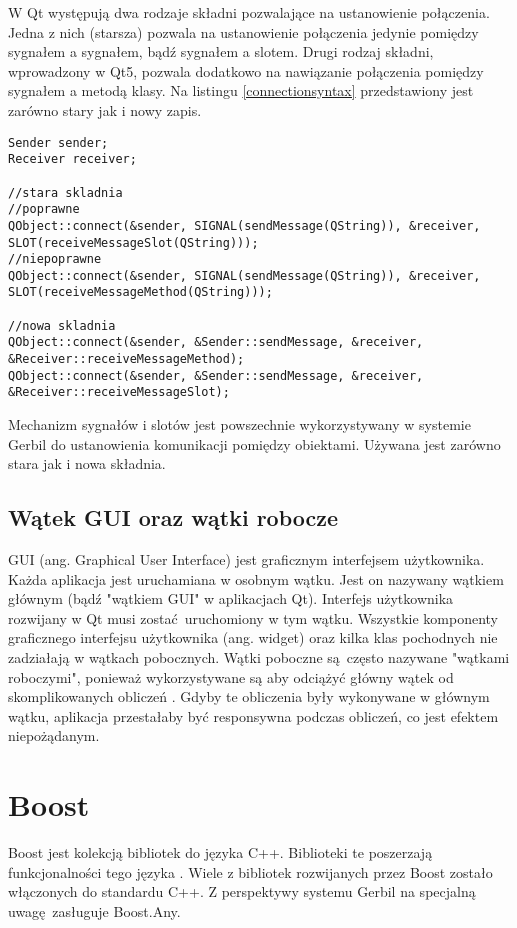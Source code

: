 W Qt występują dwa rodzaje składni pozwalające na ustanowienie połączenia. Jedna z nich (starsza) pozwala na ustanowienie połączenia jedynie pomiędzy sygnałem a sygnałem, bądź sygnałem a slotem. Drugi rodzaj składni, wprowadzony w Qt5, pozwala dodatkowo na nawiązanie połączenia pomiędzy sygnałem a metodą klasy. Na listingu \ref{connectionsyntax} przedstawiony jest zarówno stary jak i nowy zapis.

\begin{minipage}{\textwidth}

	\begin{lstlisting}[label=connectionsyntax, caption={Składnia tworzenia połączeń między obiektami},alsoletter={()[].=}]
Sender sender;
Receiver receiver;

//stara skladnia
//poprawne
QObject::connect(&sender, SIGNAL(sendMessage(QString)), &receiver, SLOT(receiveMessageSlot(QString)));
//niepoprawne
QObject::connect(&sender, SIGNAL(sendMessage(QString)), &receiver, SLOT(receiveMessageMethod(QString)));

//nowa skladnia
QObject::connect(&sender, &Sender::sendMessage, &receiver, &Receiver::receiveMessageMethod);
QObject::connect(&sender, &Sender::sendMessage, &receiver, &Receiver::receiveMessageSlot);
	\end{lstlisting}
\end{minipage}

Mechanizm sygnałów i slotów jest powszechnie wykorzystywany w systemie Gerbil do ustanowienia komunikacji pomiędzy obiektami. Używana jest zarówno stara jak i nowa składnia.

\subsection{Wątek GUI oraz wątki robocze}
GUI (ang. Graphical User Interface) jest graficznym interfejsem użytkownika. Każda aplikacja jest uruchamiana w osobnym wątku. Jest on nazywany wątkiem głównym (bądź "wątkiem GUI" w aplikacjach Qt). Interfejs użytkownika rozwijany w Qt musi zostać uruchomiony w tym wątku. Wszystkie komponenty graficznego interfejsu użytkownika (ang. widget) oraz kilka klas pochodnych nie zadziałają w wątkach pobocznych. Wątki poboczne są często nazywane "wątkami roboczymi", ponieważ wykorzystywane są aby odciążyć główny wątek od skomplikowanych obliczeń \cite{Qtdoc}. Gdyby te obliczenia były wykonywane w głównym wątku, aplikacja przestałaby być responsywna podczas obliczeń, co jest efektem niepożądanym.

 \section{Boost}
Boost jest kolekcją bibliotek do języka C++. Biblioteki te poszerzają funkcjonalności tego języka \cite{boost}. Wiele z bibliotek rozwijanych przez Boost zostało włączonych do standardu C++. Z perspektywy systemu Gerbil na specjalną uwagę zasługuje Boost.Any.




